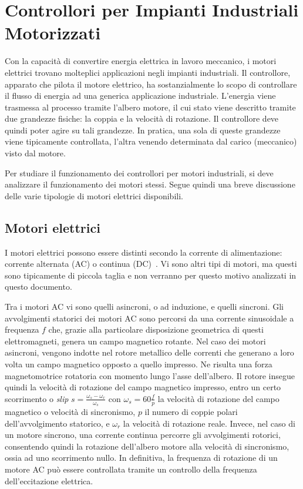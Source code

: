 \chapter{Controllori per Impianti Industriali Motorizzati}
\label{ch:controllori}

Con la capacità di convertire energia elettrica in lavoro meccanico, i motori elettrici trovano molteplici applicazioni negli impianti industriali. Il controllore, apparato che pilota il motore elettrico, ha sostanzialmente lo scopo di controllare il flusso di energia ad una generica applicazione industriale. L'energia viene trasmessa al processo tramite l'albero motore, il cui stato viene descritto tramite due grandezze fisiche: la coppia e la velocità di rotazione. Il controllore deve quindi poter agire su tali grandezze. In pratica, una sola di queste grandezze viene tipicamente controllata, l'altra venendo determinata dal carico (meccanico) visto dal motore.

Per studiare il funzionamento dei controllori per motori industriali, si deve analizzare il funzionamento dei motori stessi. Segue quindi una breve discussione delle varie tipologie di motori elettrici disponibili.

\section{Motori elettrici}

I motori elettrici possono essere distinti secondo la corrente di alimentazione: corrente alternata (AC) o continua (DC)~\cite{beaty2004, hughes2006}. Vi sono altri tipi di motori, ma questi sono tipicamente di piccola taglia e non verranno per questo motivo analizzati in questo documento.

Tra i motori AC vi sono quelli asincroni, o ad induzione, e quelli sincroni. Gli avvolgimenti statorici dei motori AC sono percorsi da una corrente sinusoidale a frequenza $f$ che, grazie alla particolare disposizione geometrica di questi elettromagneti, genera un campo magnetico rotante. Nel caso dei motori asincroni, vengono indotte nel rotore metallico delle correnti che generano a loro volta un campo magnetico opposto a quello impresso. Ne risulta una forza magnetomotrice rotatoria con momento lungo l'asse dell'albero. Il rotore insegue quindi la velocità di rotazione del campo magnetico impresso, entro un certo scorrimento o \textit{slip} $s = \frac{\omega_s - \omega_r}{\omega_s}$ con $\omega_s = 60\frac{f}{p}$ la velocità di rotazione del campo magnetico o velocità di sincronismo, $p$ il numero di coppie polari dell'avvolgimento statorico, e $\omega_r$ la velocità di rotazione reale. Invece, nel caso di un motore sincrono, una corrente continua percorre gli avvolgimenti rotorici, consentendo quindi la rotazione dell'albero motore alla velocità di sincronismo, ossia ad uno scorrimento nullo. In definitiva, la frequenza di rotazione di un motore AC può essere controllata tramite un controllo della frequenza dell'eccitazione elettrica.

